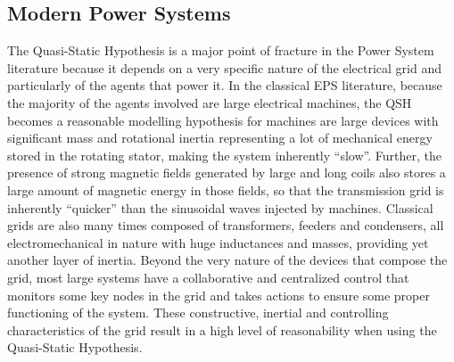 \subsection{Modern Power Systems}\label{subsec:in} %

	The Quasi-Static Hypothesis is a major point of fracture in the Power System literature because it depends on a very specific nature of the electrical grid and particularly of the agents that power it. In the classical EPS literature, because the majority of the agents involved are large electrical machines, the QSH becomes a reasonable modelling hypothesis for machines are large devices with significant mass and rotational inertia representing a lot of mechanical energy stored in the rotating stator, making the system inherently ``slow''. Further, the presence of strong magnetic fields generated by large and long coils also stores a large amount of magnetic energy in those fields, so that the transmission grid is inherently ``quicker'' than the sinusoidal waves injected by machines. Classical grids are also many times composed of transformers, feeders and condensers, all electromechanical in nature with huge inductances and masses, providing yet another layer of inertia. Beyond the very nature of the devices that compose the grid, most large systems have a collaborative and centralized control that monitors some key nodes in the grid and takes actions to ensure some proper functioning of the system. These constructive, inertial and controlling characteristics of the grid result in a high level of reasonability when using the Quasi-Static Hypothesis.


